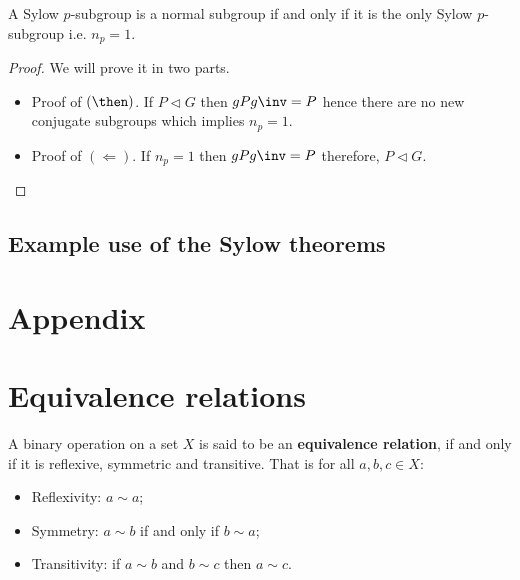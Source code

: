 \documentclass[12pt, a4paper]{article}
\begin{document}
\begin{mdthm}
    A Sylow \(p\)-subgroup is a normal subgroup if and only if it is the only Sylow \(p\)-subgroup i.e. \(n_p=1\).
\end{mdthm}

\begin{proof}
    We will prove it in two parts.
    \begin{itemize}
        \item Proof of \((\then)\). If \(P \triangleleft G\) then \(gPg\inv =P\) hence there are no new conjugate subgroups which implies \(n_p=1\).
        \item Proof of \((\Leftarrow)\). If \(n_p=1\) then \(gPg\inv =P\) therefore, \(P \triangleleft G\).
    \end{itemize}
\end{proof}

\subsection{Example use of the Sylow theorems}












\pagebreak

\appendix

\section*{Appendix}

\section{Equivalence relations}

\begin{definition}
    A binary operation on a set \(X\) is said to be an \textbf{equivalence relation}, if and only if it is reflexive, symmetric and transitive. That is for all \(a,b,c \in X\):
    \begin{itemize}
        \item Reflexivity: \(a \sim a\);
        \item Symmetry: \(a \sim b\) if and only if \(b\sim a\);
        \item Transitivity: if \(a\sim b\) and \(b\sim c\) then \(a\sim c\).
    \end{itemize}
\end{definition}
\end{document}
